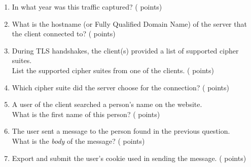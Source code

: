 \begin{enumerate}
  \item \hypertarget{cp1year}{In what year was this traffic captured? ( points)} \label{itm:year}

  \item \hypertarget{cp1domain}{What is the hostname (or Fully Qualified Domain Name) of the server that the client connected to? ( points)} \label{itm:domain}

  \item \hypertarget{cp1cslist}{During TLS handshakes, the client(s) provided a list of supported cipher suites.\\
  List the supported cipher suites from one of the clients. ( points)} \label{itm:cslist}


  \item \hypertarget{cp1servercs}{Which cipher suite did the server choose for the connection? ( points)} \label{itm:servercs}


  \item \hypertarget{cp1name}{A user of the client searched a person's name on the website.\\
  What is the first name of this person? ( points)} \label{itm:name}

  \item \hypertarget{cp1msg}{The user sent a message to the person found in the previous question.\\
  What is the \textit{body} of the message? ( points)} \label{itm:msg}


  \item \hypertarget{cp1cookie}{Export and submit the user's cookie used in sending the message. ( points)} \label{itm:cookie}


\end{enumerate}

